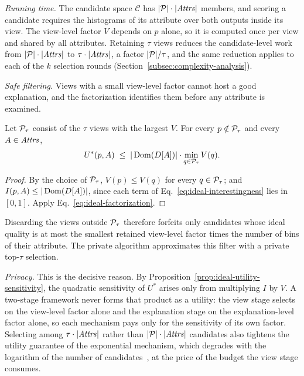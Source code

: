 \emph{Running time.}
The candidate space $\mathcal{C}$ has $|\mathcal{P}|\cdot|\mathit{Attrs}|$ members, and scoring a candidate requires the histograms of its attribute over both outputs inside its view.
The view-level factor $V$ depends on $p$ alone, so it is computed once per view and shared by all attributes.
Retaining $\tau$ views reduces the candidate-level work from $|\mathcal{P}|\cdot|\mathit{Attrs}|$ to $\tau\cdot|\mathit{Attrs}|$, a factor $|\mathcal{P}|/\tau$, and the same reduction applies to each of the $k$ selection rounds (Section~\ref{subsec:complexity-analysis}).

\emph{Safe filtering.}
Views with a small view-level factor cannot host a good explanation, and the factorization identifies them before any attribute is examined.

\begin{lemma}[Filtering]
\label{lem:filtering}
Let $\mathcal{P}_\tau$ consist of the $\tau$ views with the largest $V$.
For every $p\notin\mathcal{P}_\tau$ and every $A\in\mathit{Attrs}$,
\[
U^*(p,A)\;\le\;|\operatorname{Dom}(D[A])|\cdot\min_{q\in\mathcal{P}_\tau}V(q).
\]
\end{lemma}

\begin{proof}
By the choice of $\mathcal{P}_\tau$, $V(p)\le V(q)$ for every $q\in\mathcal{P}_\tau$; and $I(p,A)\le|\operatorname{Dom}(D[A])|$, since each term of Eq.~\eqref{eq:ideal-interestingness} lies in $[0,1]$.
Apply Eq.~\eqref{eq:ideal-factorization}.
\end{proof}

Discarding the views outside $\mathcal{P}_\tau$ therefore forfeits only candidates whose ideal quality is at most the smallest retained view-level factor times the number of bins of their attribute.
The private algorithm approximates this filter with a private top-$\tau$ selection.

\emph{Privacy.}
This is the decisive reason.
By Proposition~\ref{prop:ideal-utility-sensitivity}, the quadratic sensitivity of $U^*$ arises only from multiplying $I$ by $V$.
A two-stage framework never forms that product as a utility: the view stage selects on the view-level factor alone and the explanation stage on the explanation-level factor alone, so each mechanism pays only for the sensitivity of its own factor.
Selecting among $\tau\cdot|\mathit{Attrs}|$ rather than $|\mathcal{P}|\cdot|\mathit{Attrs}|$ candidates also tightens the utility guarantee of the exponential mechanism, which degrades with the logarithm of the number of candidates~\cite{mcsherry2007,TheAlgFoundDP2014}, at the price of the budget the view stage consumes.

